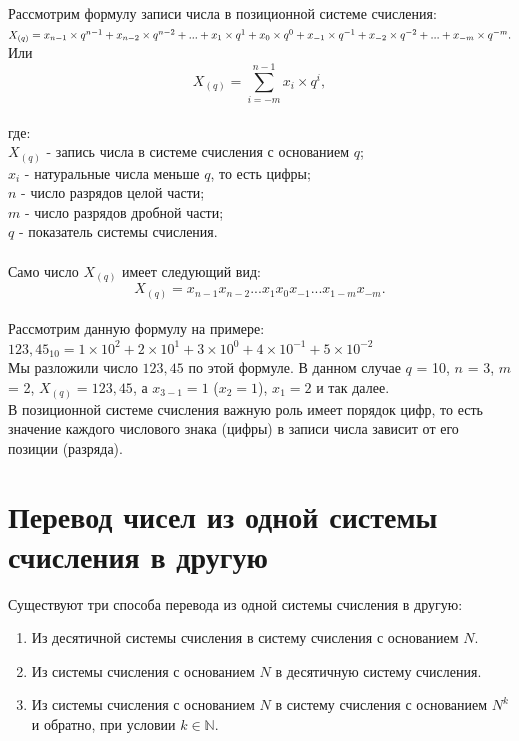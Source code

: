 Рассмотрим формулу записи числа в позиционной системе счисления:
\\$X_{(q)} = x_{n-1}\times q^{n-1} + x_{n-2}\times q^{n-2} + ... + x_{1}\times q^{1} + x_{0}\times q^{0} + x_{-1}\hm\times q^{-1}\hm + x_{-2}\hm\times q^{-2}\hm + ... + x_{-m}\times q^{-m}.$
\\Или
\\$$X_{(q)} = \sum_{i=-m}^{n-1} x_{i}\times q^{i},$$
\\где:
\\$X_{(q)}$ - запись числа в системе счисления с основанием $q$;
\\$x_{i}$ - натуральные числа меньше $q$, то есть цифры;
\\$n$ - число разрядов целой части;
\\$m$ - число разрядов дробной части;
\\$q$ - показатель системы счисления.
\\
\\Само число $X_{(q)}$ имеет следующий вид:
\\$$X_{(q)} = x_{n-1}x_{n-2}...x_{1}x_{0}x_{-1}...x_{1-m}x_{-m}.$$
\\Рассмотрим данную формулу на примере:
\\$123,45_{10} = 1\times 10^{2} + 2\times 10^{1} + 3\times 10^{0} + 4\times 10^{-1} + 5\times 10^{-2}$
\\Мы разложили число $123,45$ по этой формуле. В данном случае $q$ = 10, $n$ = 3, $m$ = 2, $X_{(q)} = 123,45$, а $x_{3-1} = 1$ ($x_{2} = 1$), $x_{1} = 2$ и так далее.
\\В позиционной системе счисления важную роль имеет порядок цифр, то есть значение каждого числового знака (цифры) в записи числа зависит от его позиции (разряда).

\section{Перевод чисел из одной системы счисления в другую}

Существуют три способа перевода из одной системы счисления в другую:
\begin{enumerate}
\item Из десятичной системы счисления в систему счисления с основанием $N$.
\item Из системы счисления с основанием $N$ в десятичную систему счисления.
\item Из системы счисления с основанием $N$ в систему счисления с основанием $N^{k}$ и обратно, при условии $k \in \mathbb{N}$.
\end{enumerate}

